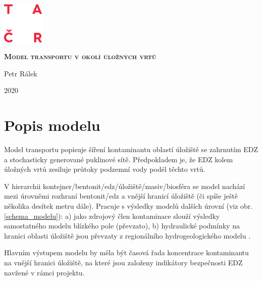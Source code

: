 \documentclass[11pt,a4paper]{article}
\newcommand{\obraz}[1]{(viz obr. \ref{#1})}
\newcommand{\jb}[1]{{\color{violet} JB: #1}}
\begin{document}
\begin{onehalfspacing} 


\begin{titlepage}
    \includegraphics[width=2cm]{logo_TACR_zakl.pdf}

    \vspace{6cm}
    {\centering	
      {\scshape\bf\huge Model transportu v okolí úložných vrtů\par}
      \vspace{3cm}
      
      {\LARGE Petr Rálek}
      
      \vspace{1cm}
      {\LARGE 2020}
      
    }
    \vfill
\end{titlepage}



\section{Popis modelu}

Model transportu popisuje šíření kontaminantu oblastí úložiště se zahrnutím EDZ a stochasticky generované puklinové sítě. Předpokladem je, že EDZ kolem úložných vrtů zesiluje průtoky podzemní vody podél těchto vrtů.

V hierarchii kontejner/bentonit/edz/úložiště/masiv/biosféra se model nachází mezi úrovněmi rozhraní bentonit/edz a vnější hranicí úložiště (či spíše ještě několika desítek metru dále). Pracuje s výsledky modelů dalších úrovní \obraz{schema_modelu}: a) jako zdrojový člen kontaminace slouží výsledky samostatného modelu blízkého pole (převzato), b) hydraulické podmínky na hranici oblasti úložiště jsou převzaty z regionálního hydrogeologického modelu \cite{riha_hradek}. 

Hlavním výstupem modelu by měla být časová řada koncentrace kontaminantu na vnější hranici úložiště,
na které jsou založeny indikátory bezpečnosti EDZ navžené v rámci projektu.



\end{onehalfspacing}
\end{document}
